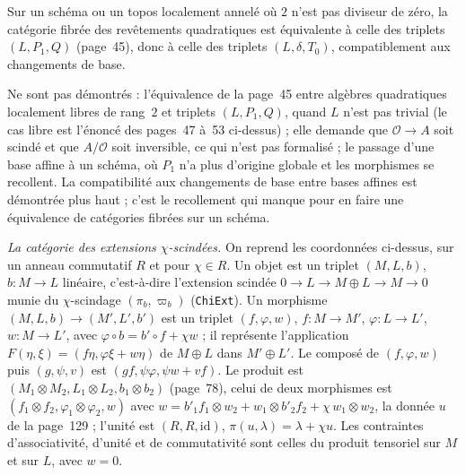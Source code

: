 \begin{enonce}\nonverifie
Sur un schéma ou un topos localement annelé où $2$ n'est pas diviseur de zéro, la catégorie fibrée des revêtements quadratiques est équivalente à celle des triplets $(L, P_1, Q)$ (page~45), donc à celle des triplets $(L, \delta, T_0)$, compatiblement aux changements de base.
\end{enonce}

\noindent Ne sont pas démontrés : l'équivalence de la page~45 entre algèbres quadratiques localement libres de rang~$2$ et triplets $(L, P_1, Q)$, quand $L$ n'est pas trivial (le cas libre est l'énoncé des pages~47 à~53 ci-dessus) ; elle demande que $\mathcal O \to A$ soit scindé et que $A/\mathcal O$ soit inversible, ce qui n'est pas formalisé ; le passage d'une base affine à un schéma, où $P_1$ n'a plus d'origine globale et les morphismes se recollent. La compatibilité aux changements de base entre bases affines est démontrée plus haut ; c'est le recollement qui manque pour en faire une équivalence de catégories fibrées sur un schéma.

\noindent\emph{La catégorie des extensions $\chi$-scindées.} On reprend les coordonnées ci-dessus, sur un anneau commutatif $R$ et pour $\chi \in R$. Un objet est un triplet $(M, L, b)$, $b : M \to L$ linéaire, c'est-à-dire l'extension scindée $0 \to L \to M \oplus L \to M \to 0$ munie du $\chi$-scindage $(\pi_b, \varpi_b)$ (\texttt{ChiExt}). Un morphisme $(M, L, b) \to (M', L', b')$ est un triplet $(f, \varphi, w)$, $f : M \to M'$, $\varphi : L \to L'$, $w : M \to L'$, avec $\varphi \circ b = b' \circ f + \chi w$ ; il représente l'application $F(\eta, \xi) = (f\eta, \varphi\xi + w\eta)$ de $M \oplus L$ dans $M' \oplus L'$. Le composé de $(f, \varphi, w)$ puis $(g, \psi, v)$ est $(gf, \psi\varphi, \psi w + vf)$. Le produit est $(M_1 \otimes M_2, L_1 \otimes L_2, b_1 \otimes b_2)$ (page~78), celui de deux morphismes est $(f_1 \otimes f_2, \varphi_1 \otimes \varphi_2, w)$ avec $w = b'_1f_1 \otimes w_2 + w_1 \otimes b'_2f_2 + \chi\, w_1 \otimes w_2$, la donnée $u$ de la page~129 ; l'unité est $(R, R, \mathrm{id})$, $\pi(u, \lambda) = \lambda + \chi u$. Les contraintes d'associativité, d'unité et de commutativité sont celles du produit tensoriel sur $M$ et sur $L$, avec $w = 0$.

